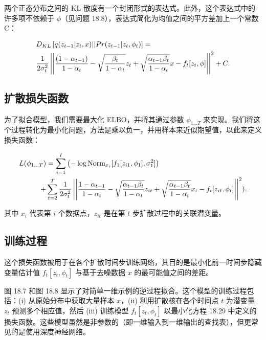 \documentclass[lang=cn,newtx,10pt,scheme=chinese]{elegantbook}
\begin{document}
两个正态分布之间的 KL 散度有一个封闭形式的表达式。此外，这个表达式中的许多项不依赖于 \(\phi\)（见问题 18.8），表达式简化为均值之间的平方差加上一个常数 C：

\begin{align}
&D_{KL} \left[ q(z_{t-1}|z_t, x)||Pr(z_{t-1}|z_t, \phi_t) \right] = \notag \\
&\frac{1}{2\sigma^2_t} \left| \left| \frac{(1 - \alpha_{t-1})}{1 - \alpha_t} - \sqrt{\frac{\beta_t}{1 - \alpha_t}} z_t + \sqrt{\frac{\alpha_{t-1}\beta_t}{1 - \alpha_t}} x - f_t[z_t, \phi] \right| \right|^2 + C. 
\end{align}

\subsection{扩散损失函数}
为了拟合模型，我们需要最大化 ELBO，并将其通过参数 \(\phi_{1...T}\) 来实现。我们将这个过程转化为最小化问题，方法是乘以负一，并用样本来近似期望值，以此来定义损失函数：


\begin{align}
L(\phi_{1...T}) &= \sum_{i=1}^I \left( -\log \text{Norm}_{x_i} [f_1[z_{i1}, \phi_1], \sigma^2_{1}] \right) \notag \\ 
+ &\sum_{t=2}^T \frac{1}{2\sigma^2_t} \left| \left| \frac{1 - \alpha_{t-1}}{1 - \alpha_t} - \sqrt{\frac{\alpha_{t-1}\beta_t}{1 - \alpha_t}} z_{it} + \sqrt{\frac{\alpha_{t-1}\beta_t}{1 - \alpha_t}} x_i - f_t[z_{it}, \phi_t] \right| \right|^2), 
\end{align} 



其中 \(x_i\) 代表第 \(i\) 个数据点，\(z_{it}\) 是在第 \(t\) 步扩散过程中的关联潜变量。

\subsection{训练过程}
这个损失函数被用于在各个扩散时间步训练网络，其目的是最小化前一时间步隐藏变量估计值 \(f_t[z_t, \phi_t]\) 与基于去噪数据 \(x\) 的最可能值之间的差距。

图 18.7 和图 18.8 显示了对简单一维示例的逆过程拟合。这个模型的训练过程包括：(i) 从原始分布中获取大量样本 \(x\)，(ii) 利用扩散核在各个时间点 \(t\) 为潜变量 \(z_t\) 预测多个相应值，然后 (iii) 训练模型 \(f_t[z_t, \phi_t]\) 以最小化方程 18.29 中定义的损失函数。这些模型虽然是非参数的（即一维输入到一维输出的查找表），但更常见的是使用深度神经网络。
\end{document}

